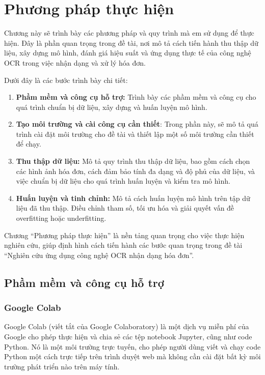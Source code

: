 \chapter{Phương pháp thực hiện}
Chương này sẽ trình bày các phương pháp và quy trình mà em sử dụng để thực hiện. Đây là phần quan trọng trong đề tài, nơi mô tả cách tiến hành thu thập dữ liệu, xây dựng mô hình, đánh giá hiệu suất và ứng dụng thực tế của công nghệ OCR trong việc nhận dạng và xử lý hóa đơn.

Dưới đây là các bước trình bày chi tiết:
\begin{enumerate}
    \item \textbf{Phầm mềm và công cụ hỗ trợ:} Trình bày các phầm mềm và công cụ cho quá trình chuẩn bị dữ liệu, xây dựng và huấn luyện mô hình.
    \item \textbf{Tạo môi trường và cài công cụ cần thiết}: Trong phần này, sẽ mô tả quá trình cài đặt môi trường cho đề tài và thiết lập một số môi trường cần thiết để chạy.
    \item \textbf{Thu thập dữ liệu:} Mô tả quy trình thu thập dữ liệu, bao gồm cách chọn các hình ảnh hóa đơn, cách đảm bảo tính đa dạng và độ phủ của dữ liệu, và việc chuẩn bị dữ liệu cho quá trình huấn luyện và kiểm tra mô hình.
    \item \textbf{Huấn luyện và tinh chỉnh:} Mô tả cách huấn luyện mô hình trên tập dữ liệu đã thu thập. Điều chỉnh tham số, tối ưu hóa và giải quyết vấn đề overfitting hoặc underfitting.

\end{enumerate}

Chương ``Phương pháp thực hiện'' là nền tảng quan trọng cho việc thực hiện nghiên cứu, giúp định hình cách tiến hành các bước quan trọng trong đề tài ``Nghiên cứu ứng dụng công nghệ OCR nhận dạng hóa đơn''.

\section{Phầm mềm và công cụ hỗ trợ}
\subsection{Google Colab}
Google Colab (viết tắt của Google Colaboratory) là một dịch vụ miễn phí của Google cho phép thực hiện và chia sẻ các tệp notebook Jupyter, cũng như code Python. Nó là một môi trường trực tuyến, cho phép người dùng viết và chạy code Python một cách trực tiếp trên trình duyệt web mà không cần cài đặt bất kỳ môi trường phát triển nào trên máy tính.

